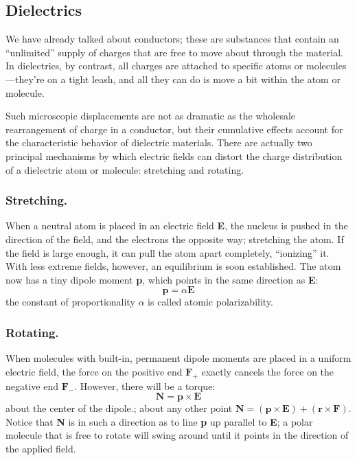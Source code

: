 \documentclass[../../../main.tex]{subfiles}
\begin{document}
\subsection{Dielectrics}
We have already talked about conductors; these are substances that contain an “unlimited” supply of charges that are free to move about through the material. In dielectrics, by contrast, all charges are attached to specific atoms or molecules—they’re on a tight leash, and all they can do is move a bit within the atom or molecule. 

Such microscopic displacements are not as dramatic as the wholesale rearrangement of charge in a conductor, but their cumulative effects account for the characteristic behavior of dielectric materials. There are actually two principal mechanisms by which electric fields can distort the charge distribution of a dielectric atom or molecule: stretching and rotating. 

\subsubsection{Stretching.} When a neutral atom is placed in an electric field \textbf{E}, the nucleus is pushed in the direction of the field, and the electrons the opposite way; stretching the atom. If the field is large enough, it can pull the atom apart completely, “ionizing” it. With less extreme fields, however, an equilibrium is soon established. The atom now has a tiny dipole moment \textbf{p}, which points in the same direction as \textbf{E}:
\begin{equation*}
    \mathbf{p} = \alpha \mathbf{E}
\end{equation*}     
the constant of proportionality $\alpha$ is called atomic polarizability. 

\subsubsection{Rotating.} When molecules with built-in, permanent dipole moments are placed in a uniform electric field, the force on the positive end $\mathbf{F}_+$ exactly cancels the force on the negative end $\mathbf{F}_-$. However, there will be a torque:
\begin{equation*}
    \mathbf{N}=\mathbf{p}\times\mathbf{E}
\end{equation*}
about the center of the dipole.; about any other point $\mathbf{N}=(\mathbf{p}\times\mathbf{E}) + (\mathbf{r}\times \mathbf{F})$. Notice that \textbf{N} is in such a direction as to line \textbf{p} up parallel to \textbf{E}; a polar molecule that is free to rotate will swing around until it points in the direction of the applied field. 
\end{document}
